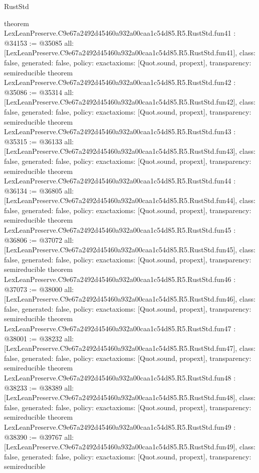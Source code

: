 \begin{lexlean}{RustStd}
\begin{coremodule}
{}
theorem LexLeanPreserve.C9e67a2492d45460a932a00caa1c54d85.R5.RustStd.fun41 : @34153 := @35085 {
  all: [LexLeanPreserve.C9e67a2492d45460a932a00caa1c54d85.R5.RustStd.fun41],
  class: false,
  generated: false,
  policy: exact{axioms: [Quot.sound, propext]},
  transparency: semireducible
}
theorem LexLeanPreserve.C9e67a2492d45460a932a00caa1c54d85.R5.RustStd.fun42 : @35086 := @35314 {
  all: [LexLeanPreserve.C9e67a2492d45460a932a00caa1c54d85.R5.RustStd.fun42],
  class: false,
  generated: false,
  policy: exact{axioms: [Quot.sound, propext]},
  transparency: semireducible
}
theorem LexLeanPreserve.C9e67a2492d45460a932a00caa1c54d85.R5.RustStd.fun43 : @35315 := @36133 {
  all: [LexLeanPreserve.C9e67a2492d45460a932a00caa1c54d85.R5.RustStd.fun43],
  class: false,
  generated: false,
  policy: exact{axioms: [Quot.sound, propext]},
  transparency: semireducible
}
theorem LexLeanPreserve.C9e67a2492d45460a932a00caa1c54d85.R5.RustStd.fun44 : @36134 := @36805 {
  all: [LexLeanPreserve.C9e67a2492d45460a932a00caa1c54d85.R5.RustStd.fun44],
  class: false,
  generated: false,
  policy: exact{axioms: [Quot.sound, propext]},
  transparency: semireducible
}
theorem LexLeanPreserve.C9e67a2492d45460a932a00caa1c54d85.R5.RustStd.fun45 : @36806 := @37072 {
  all: [LexLeanPreserve.C9e67a2492d45460a932a00caa1c54d85.R5.RustStd.fun45],
  class: false,
  generated: false,
  policy: exact{axioms: [Quot.sound, propext]},
  transparency: semireducible
}
theorem LexLeanPreserve.C9e67a2492d45460a932a00caa1c54d85.R5.RustStd.fun46 : @37073 := @38000 {
  all: [LexLeanPreserve.C9e67a2492d45460a932a00caa1c54d85.R5.RustStd.fun46],
  class: false,
  generated: false,
  policy: exact{axioms: [Quot.sound, propext]},
  transparency: semireducible
}
theorem LexLeanPreserve.C9e67a2492d45460a932a00caa1c54d85.R5.RustStd.fun47 : @38001 := @38232 {
  all: [LexLeanPreserve.C9e67a2492d45460a932a00caa1c54d85.R5.RustStd.fun47],
  class: false,
  generated: false,
  policy: exact{axioms: [Quot.sound, propext]},
  transparency: semireducible
}
theorem LexLeanPreserve.C9e67a2492d45460a932a00caa1c54d85.R5.RustStd.fun48 : @38233 := @38389 {
  all: [LexLeanPreserve.C9e67a2492d45460a932a00caa1c54d85.R5.RustStd.fun48],
  class: false,
  generated: false,
  policy: exact{axioms: [Quot.sound, propext]},
  transparency: semireducible
}
theorem LexLeanPreserve.C9e67a2492d45460a932a00caa1c54d85.R5.RustStd.fun49 : @38390 := @39767 {
  all: [LexLeanPreserve.C9e67a2492d45460a932a00caa1c54d85.R5.RustStd.fun49],
  class: false,
  generated: false,
  policy: exact{axioms: [Quot.sound, propext]},
  transparency: semireducible
}
\end{coremodule}
\end{lexlean}
